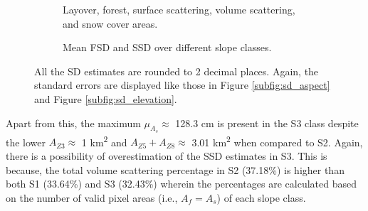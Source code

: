 \documentclass[review]{elsarticle}
\numberwithin{equation}{section}
\numberwithin{figure}{section}
\numberwithin{table}{section}
\begin{document}
\afterpage{\FloatBarrier}
\begin{figure}[!htbp]
    \centering
    \begin{subfigure}[t]{\textwidth}
        \caption{Layover, forest, surface scattering, volume scattering, and snow cover areas.}
        \label{subfig:area_slope}
    \end{subfigure}
    \begin{subfigure}[t]{\textwidth}
        \caption{Mean FSD and SSD over different slope classes.}
        \label{subfig:sd_slope}
    \end{subfigure}
    \caption{All the SD estimates are rounded to 2 decimal places. Again, the standard errors are displayed like those in Figure \ref{subfig:sd_aspect} and Figure \ref{subfig:sd_elevation}.}
    \label{fig:sa_slope}
\end{figure}

Apart from this, the maximum $\mu_{A_s} \approx$ 128.3 cm is present in the S3 class despite the lower $A_{Z3} \approx$ 1 km\textsuperscript{2} and $A_{Z5} + A_{Z8} \approx$ 3.01 km\textsuperscript{2} when compared to S2. Again, there is a possibility of overestimation of the SSD estimates in S3. This is because, the total volume scattering percentage in S2 (37.18\%) is higher than both S1 (33.64\%) and S3 (32.43\%) wherein the percentages are calculated based on the number of valid pixel areas (i.e., $A_f = A_s$) of each slope class.
\end{document}
